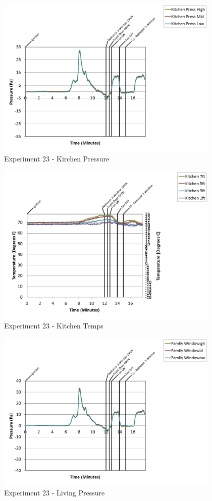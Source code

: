 \documentclass{article}
\begin{document}
\begin{appendices}
\begin{figure}[h!]
	\centering
	\includegraphics[height=3.05in]{0_Images/Results_Charts/Exp_23_Charts/KirchenPressure.png}
	\caption{Experiment 23 - Kirchen Pressure}
\end{figure}

\clearpage

\begin{figure}[h!]
	\centering
	\includegraphics[height=3.05in]{0_Images/Results_Charts/Exp_23_Charts/KitchenTemps.png}
	\caption{Experiment 23 - Kitchen Temps}
\end{figure}


\begin{figure}[h!]
	\centering
	\includegraphics[height=3.05in]{0_Images/Results_Charts/Exp_23_Charts/LivingPressure.png}
	\caption{Experiment 23 - Living Pressure}
\end{figure}


\end{appendices}
\end{document}
